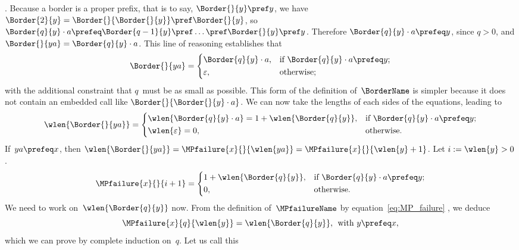 \prefeq {}\). Because a border is a proper prefix, that
is to say, \(\Border{}{y} \pref y\), we have \(\Border{2}{y} =
\Border{}{\Border{}{y}} \pref \Border{}{y}\), so \(\Border{q}{y} \cdot
a \prefeq \Border{q-1}{y} \pref \dots \pref \Border{}{y} \pref
y\). Therefore \(\Border{q}{y} \cdot a \prefeq y\), since \({q > 0}\),
and \(\Border{}{ya} = \Border{q}{y} \cdot a\). This line of reasoning
establishes that
\begin{equation*}
\Border{}{ya} =
\left\{
  \begin{aligned}
   & \Border{q}{y} \cdot a,
   && \text{if \(\Border{q}{y} \cdot a \prefeq y\)};\\
   & \varepsilon,
   && \text{otherwise;}
  \end{aligned}
\right.
\end{equation*}
with the additional constraint that \(q\)~must be as small as
possible. This form of the definition of~\(\BorderName\) is simpler
because it does not contain an embedded call like
\(\Border{}{\Border{}{y} \cdot a}\). We can now take the lengths of
each sides of the equations, leading to
\begin{equation*}
\wlen{\Border{}{ya}} =
\left\{
  \begin{aligned}
   & \wlen{\Border{q}{y} \cdot a} = 1 + \wlen{\Border{q}{y}},
   && \text{if \(\Border{q}{y} \cdot a \prefeq y\)};\\
   & \wlen{\varepsilon} = 0,
   && \text{otherwise.}
  \end{aligned}
\right.
\end{equation*}
If~\({ya \prefeq x}\), then \(\wlen{\Border{}{ya}} =
\MPfailure{x}{}{\wlen{ya}} = \MPfailure{x}{}{\wlen{y}+1}\). Let \(i :=
\wlen{y} > 0\).
\begin{equation*}
\MPfailure{x}{}{i+1} =
\left\{
  \begin{aligned}
   & 1 + \wlen{\Border{q}{y}},
   && \text{if \(\Border{q}{y} \cdot a \prefeq y\)};\\
   & 0,
   && \text{otherwise.}
  \end{aligned}
\right.
\end{equation*}
We need to work on~\(\wlen{\Border{q}{y}}\) now. From the definition
of~\(\MPfailureName\) by equation~\eqref{eq:MP_failure}
, we deduce
\begin{equation}
\MPfailure{x}{q}{\wlen{y}} = \wlen{\Border{q}{y}},
\,\; \text{with \(y \prefeq x\)},
\label{eq:MP_failure_p}
\end{equation}
which we can prove by complete induction on~\(q\). Let us call this
